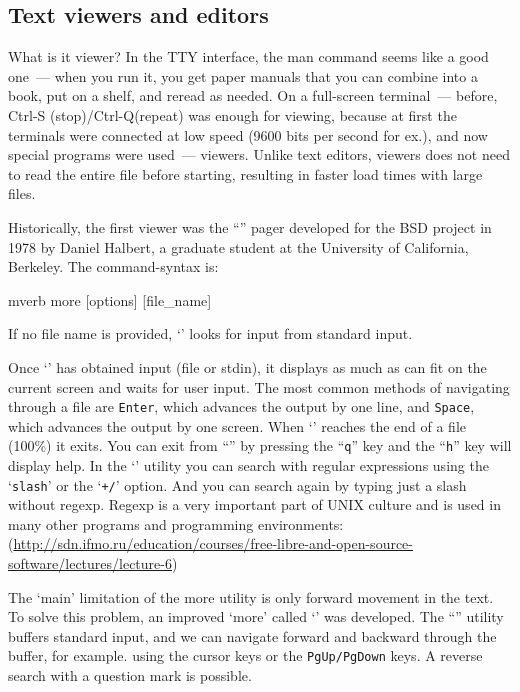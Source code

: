 \subsection*{Text viewers and editors}

What is it viewer? In the TTY interface, the man command seems like a good
one~--- when you run it, you get paper manuals that you can combine into a book,
put on a shelf, and reread as needed. On a full-screen terminal~--- before,
Ctrl-S (stop)/Ctrl-Q(repeat) was enough for viewing, because at first
the terminals were connected at low speed (9600 bits per second for ex.),
and now special programs were used~--- viewers. Unlike text editors,
viewers does not need to read the entire file before starting, resulting in
faster load times with large files.

Historically, the first viewer was the ``'' pager developed for
the BSD project in 1978 by Daniel Halbert, a graduate student at the University
of California, Berkeley. The command-syntax is:
\begin{code}{mverb}
more [options] [file_name]
\end{code}
If no file name is provided, `' looks for input from standard input.

Once `' has obtained input (file or stdin), it displays as much as
can fit on the current screen and waits for user input. The most common methods
of navigating through a file are {\tt Enter}, which advances the output by one
line, and {\tt Space}, which advances the output by one screen.  When `'
reaches the end of a file (100\%) it exits. You can exit from ``''
by pressing the ``{\tt q}'' key and the ``{\tt h}'' key will display help.
In the `' utility you can search with regular expressions using
the `{\tt slash}' or the `{\tt +/}' option. And you can search again by typing
just a slash without regexp. Regexp is a very important part of UNIX culture
and is used in many other programs and programming environments:
(\url{http://sdn.ifmo.ru/education/courses/free-libre-and-open-source-software/lectures/lecture-6})

The `main' limitation of the more utility is only forward movement in the text.
To solve this problem, an improved `more' called `' was developed.
The ``'' utility buffers standard input, and we can navigate forward
and backward through the buffer, for example. using the cursor keys or
the {\tt PgUp/PgDown} keys. A reverse search with a question mark is possible.
